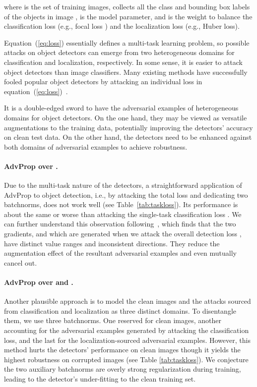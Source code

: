 \documentclass[final]{cvpr}
\begin{document}
where  is the set of training images,  collects all the class  and bounding box  labels of the objects in image ,  is the model parameter, and  is the weight to balance the classification loss  (e.g., focal loss \cite{lin2017focal}) and the localization loss  (e.g., Huber loss).

Equation~(\ref{eq:loss}) essentially defines a multi-task learning problem, so possible attacks on object detectors can emerge from two heterogeneous domains for classification and localization, respectively. In some sense, it is easier to attack object detectors  than image classifiers. Many existing methods have successfully fooled popular object detectors by attacking an individual loss in equation~(\ref{eq:loss})~\cite{xie2017adversarial, chen2019shapeshifter, kevin2018phyattack}.

It is a double-edged sword to have the adversarial examples of heterogeneous domains for object detectors. On the one hand, they may be viewed as versatile augmentations to the training data, potentially improving the detectors' accuracy on clean test data.
On the other hand, the detectors need to be enhanced against both domains of adversarial examples to achieve robustness. 

\vspace{-10pt}
\paragraph{AdvProp over .}
Due to the multi-task nature of the detectors, a straightforward application of AdvProp to object detection, i.e., by attacking the total loss  and dedicating two batchnorms, does not work well (see Table~\ref{tab:taskloss}). Its performance is about the same or worse than attacking the single-task classification loss . We can further understand this observation following~\cite{zhang2019towards}, which finds that the two gradients,  and  which are generated when we attack the overall detection loss , have distinct value ranges and inconsistent directions. They reduce the augmentation effect of the resultant adversarial examples and even mutually cancel out.


\vspace{-10pt}
\paragraph{AdvProp over  and .}
Another plausible approach is to model the clean images and the attacks sourced from classification and localization as three distinct domains. To disentangle them, we use three batchnorms. One reserved for clean images, another accounting for the adversarial examples generated by attacking the classification loss, and the last for the localization-sourced adversarial examples.
However, this method hurts the detectors' performance on clean images though it yields the highest robustness on corrupted images (see Table \ref{tab:taskloss}). We conjecture the two auxiliary batchnorms are overly strong regularization during training, leading to the detector's under-fitting to the clean training set.
\end{document}
